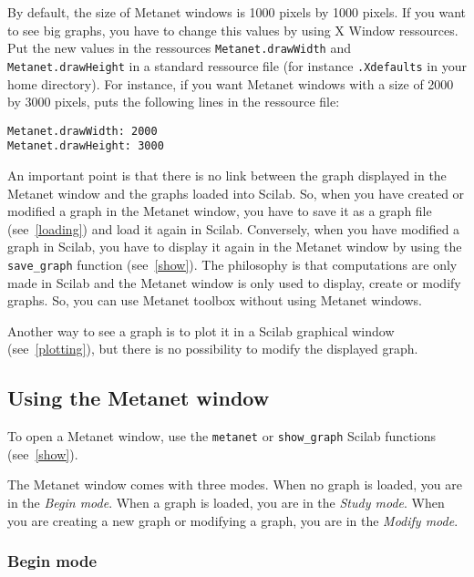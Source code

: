 \documentclass[11pt]{article}
\newcommand{\func}[1]{\texttt{#1}}
\begin{document}
By default, the size of Metanet windows is 1000 pixels by 1000
pixels. If you want to see big graphs, you have to change this values by
using X Window ressources. Put the new values in the ressources
\texttt{Metanet.drawWidth} and \texttt{Metanet.drawHeight} in a
standard ressource file (for instance \texttt{.Xdefaults} in your home
directory). For instance, if you want Metanet windows with a size of
2000 by 3000 pixels, puts the following lines in the ressource file:
\begin{verbatim}
Metanet.drawWidth: 2000
Metanet.drawHeight: 3000
\end{verbatim}

An important point is that there is no link between the graph
displayed in the Metanet window and the graphs loaded into Scilab. So,
when you have created or modified a graph in the Metanet window, you
have to save it as a graph file (see~\ref{loading}) and load it again
in Scilab. Conversely, when you have modified a graph in Scilab, you
have to display it again in the Metanet window by using the
\func{save\_graph} function (see~\ref{show}).
The philosophy is that computations are only made in Scilab and the
Metanet window is only used to display, create or modify graphs. So,
you can use Metanet toolbox without using Metanet windows.

Another way to see a graph is to plot it in a Scilab graphical window
(see~\ref{plotting}), but there is no possibility to modify the
displayed graph.

\subsection{Using the Metanet window}\label{window}

To open a Metanet window, use the \func{metanet} or
\func{show\_graph} Scilab functions (see~\ref{show}).

The Metanet window comes with three modes. When no graph is loaded,
you are in the \emph{Begin mode}. When a graph is loaded, you are in the
\emph{Study mode}. When you are creating a new graph or modifying a graph,
you are in the \emph{Modify mode}.

\subsubsection{Begin mode}
\end{document}
